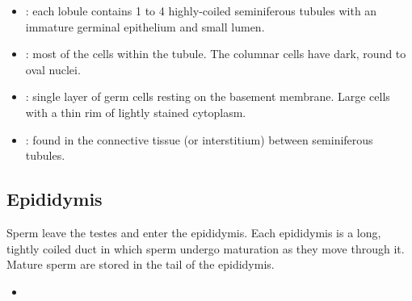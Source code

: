 \begin{multicols}{2}
\begin{itemize}
  \item {}: each lobule contains 1 to 4 highly-coiled seminiferous tubules with an immature germinal epithelium and small lumen. 
  
  \begin{center}
  \end{center}
  
  \item {}: most of the cells within the tubule. The columnar cells have dark, round to oval nuclei.
  
  \begin{center}
  \end{center}
  
  \item {}: single layer of germ cells resting on the basement membrane. Large cells with a thin rim of lightly stained cytoplasm.
  
  \begin{center}
  \end{center}
  
  \item {}: found in the connective tissue (or interstitium) between seminiferous tubules. 
  
  \begin{center}
  \end{center}
  
\end{itemize}
\end{multicols}

\newpage

\subsection{Epididymis}
Sperm leave the testes and enter the epididymis. Each epididymis is a long, tightly coiled duct in which sperm undergo maturation as they move through it. Mature sperm are stored in the tail of the epididymis.
\begin{center}
\end{center}
\begin{multicols}{2}
\begin{itemize}
  \item 
\end{itemize}
\end{multicols}

